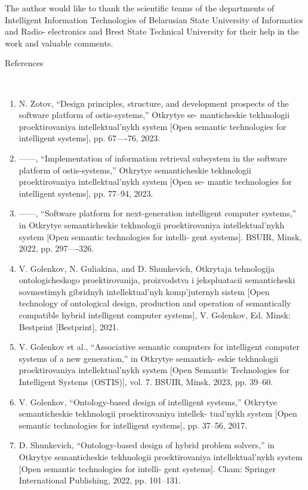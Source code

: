 ﻿\documentclass[a4paper]{article}
\begin{document}
\begin{multicols}{2}
The author would like to thank the scientific teams of
the departments of Intelligent Information Technologies
of Belarusian State University of Informatics and Radio-
electronics and Brest State Technical University for their
help in the work and valuable comments.
    \begin{center}
        \appendix References
    \end{center}
\
\begin{enumerate}
    \item N. Zotov, “Design principles, structure, and development
prospects of the software platform of ostis-systems,” Otkrytye se-
manticheskie tekhnologii proektirovaniya intellektual’nykh system
[Open semantic technologies for intelligent systems], pp. 67—-76,
2023.
\item ——, “Implementation of information retrieval subsystem in
the software platform of ostis-systems,” Otkrytye semanticheskie
tekhnologii proektirovaniya intellektual’nykh system [Open se-
mantic technologies for intelligent systems], pp. 77–94, 2023.
\item ——, “Software platform for next-generation intelligent computer
systems,” in Otkrytye semanticheskie tekhnologii proektirovaniya
intellektual’nykh system [Open semantic technologies for intelli-
gent systems]. BSUIR, Minsk, 2022, pp. 297—-326.
\item V. Golenkov, N. Guliakina, and D. Shunkevich, Otkrytaja
tehnologija ontologicheskogo proektirovanija, proizvodstva
i jekspluatacii semanticheski sovmestimyh gibridnyh
intellektual’nyh komp’juternyh sistem [Open technology of
ontological design, production and operation of semantically
compatible hybrid intelligent computer systems], V. Golenkov,
Ed. Minsk: Bestprint [Bestprint], 2021.

\item V. Golenkov et al., “Associative semantic computers for intelligent
computer systems of a new generation,” in Otkrytye semantich-
eskie tekhnologii proektirovaniya intellektual’nykh system [Open
Semantic Technologies for Intelligent Systems (OSTIS)], vol. 7.
BSUIR, Minsk, 2023, pp. 39–60.

\item V. Golenkov, “Ontology-based design of intelligent systems,”
Otkrytye semanticheskie tekhnologii proektirovaniya intellek-
tual’nykh system [Open semantic technologies for intelligent
systems], pp. 37–56, 2017.

\item D. Shunkevich, “Ontology-based design of hybrid problem
solvers,” in Otkrytye semanticheskie tekhnologii proektirovaniya
intellektual’nykh system [Open semantic technologies for intelli-
gent systems]. Cham: Springer International Publishing, 2022,
pp. 101–131.


\end{enumerate}
\end{multicols}
\end{document}
